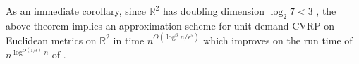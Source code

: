 \documentclass[twoside,leqno]{article}
\newcommand{\calT}{{\cal T}}
\newcommand{\opt}{\mbox{\sc opt}}
\newcommand{\OPT}{\mbox{\sc OPT}}
\newcommand{\eps}{\epsilon}
\newcommand{\cost}{\text{cost}}
\DeclarePairedDelimiter\autobracket{(}{)}
\newcommand{\br}[1]{\autobracket*{#1}}
\begin{document}
As an immediate corollary, since $\mathbb{R}^2$ has doubling dimension $\log_2 7 < 3$ \cite{disk-covering}, the above theorem implies an approximation scheme for unit demand CVRP on Euclidean metrics on $\mathbb{R}^2$ in time $n^{O(\log^{6}n/\eps^{5})}$ which improves on the run time of $n^{\log^{O(1/\epsilon)}n}$ of \cite{Das-Mathieu}. 
\begin{comment}
\begin{proof}
Let $\OPT_H$ be the optimal solution in the host graph $H$, which is the bounded treewidth graph and let $\OPT_G$ be the optimal solution in the original graph $G$. Let $\opt_G$ and $\opt_H$ denote the cost of the optimal solutions in graph $G$ and $H$. A tour is a set of edges denoting the order in which nodes are visited. Let $\cost_G(\OPT)$ denote the cost of the set of tours in $\OPT$ when used on graph $G$. Our goal is to show that $\cost_G(\OPT_H) \le (1 + \eps)\cost_G(\OPT(G)) \le (1 + \eps)\opt$. 



We will use the embedding presented by Lemma \ref{lem:doubling-embed} to embed $G$ into $H$ and use the fact that for any two nodes $u,v$, on expectation
$$d_G(u,v) \le d_H(u,v) \le (1 + \eps) d_G(u,v).$$
Note that the vertices are the same in both $H$ and $G$, so a solution to an instance in $H$ is also a solution in $G$ (and vice versa). Since $d_G(u,v) \le d_H(u,v)$, we know for any solution $\OPT$, $\cost_G(\OPT) \le \cost_H(\OPT)$. Note that $\cost_H(\OPT_H) \le \cost_H(\OPT_G)$. 
\begin{equation*}
    \begin{split}
        \cost_G(\OPT_H) & \le \cost_H(\OPT_H) \le \cost_H(\OPT_G) \\ 
        & = \sum_{\calT_i \in \OPT_G} \cost_H(\calT_i) =\sum_{\calT_i \in \OPT_G}\sum_{uv \in E(\calT_i)} d_H(u,v) \\
        & \le \sum_{\calT_i \in \OPT_G}\sum_{uv \in E(\calT_i)} (1 + \eps) d_G(u,v) \\ 
        & = (1 + \eps) \sum_{\calT_i \in \OPT_G} \cost_G(\calT_i) \\ 
        & = (1 + \eps)\cost_G(\OPT_G) \\ 
    \end{split}
\end{equation*}
Hence, for an appropriate choice of $\eps$, we can find a $(1 + \eps)$-approximation for a graph $G$ which has bounded doubling dimension. Recall that the time complexity of for splittable CVRP on bounded treewidth graphs is $n^{O(k^2 \log^{2c + 3}n/\eps^2)}$. Since the treewidth of $H$, $k \le 2^{O(D)}\br{\frac{4D \log n}{\eps}}^D$, we get that the running time of our algorithm is $n^{O(D^D \log^{2c + D + 3}n/\eps^{D+3})}$.
\end{proof}
\end{comment}
\end{document}
